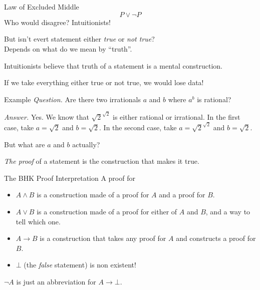 \documentclass{beamer}
\begin{document}
\section{\secTruth}

\begin{frame}{\subTruth}
	\begin{block}{Law of Excluded Middle}
		\[ P \vee \neg P \]
		\pause
		Who would disagree? \pause Intuitionists!
		\vspace{1ex}
	\end{block}
	\pause
	But isn't evert statement either \emph{true} or \emph{not true}? \\
	\pause
	Depends on what do we mean by ``truth''.
\end{frame}

\begin{frame}[t]{\subTruth}
Intuitionists believe that truth of a statement is a mental construction.

\pause
If we take everything either true or not true, we would lose data!

\pause
\begin{exampleblock}{Example}
	\textit{Question.}\; Are there two irrationals $a$ and $b$ where $a^b$ is rational?

	\textit{Answer.}\; Yes. We know that $\sqrt{2}^{\sqrt{2}}$ is either rational or irrational. In the first case, take $a = \sqrt{2}$ and $b = \sqrt{2}$. In the second case, take $a = \sqrt{2}^{\sqrt{2}}$ and $b = \sqrt{2}$.
	\vspace{1ex}
\end{exampleblock}

\pause
But what are $a$ and $b$ actually?
\end{frame}


\begin{frame}[t]{\subBHK}
 \emph{The proof} of a statement is the construction that makes it true.

\pause
\begin{block}{The BHK Proof Interpretation}
	A proof for
	\begin{itemize}
		\item $A \wedge B$ is a construction made of a proof  for $A$ and a proof for $B$.
		\item $A \vee B$ is a construction made of a proof  for either of $A$ and $B$, and a way to tell which one.
		\item $A \to B$ is a construction that takes any proof for $A$ and constructs a proof for $B$.
		\item $\bot$ (the \emph{false} statement) is non existent!
	\end{itemize}
	$\neg A$ is just an abbreviation for $A \to \bot$.
	\vspace{1ex}
\end{block}
\end{frame}
\end{document}
